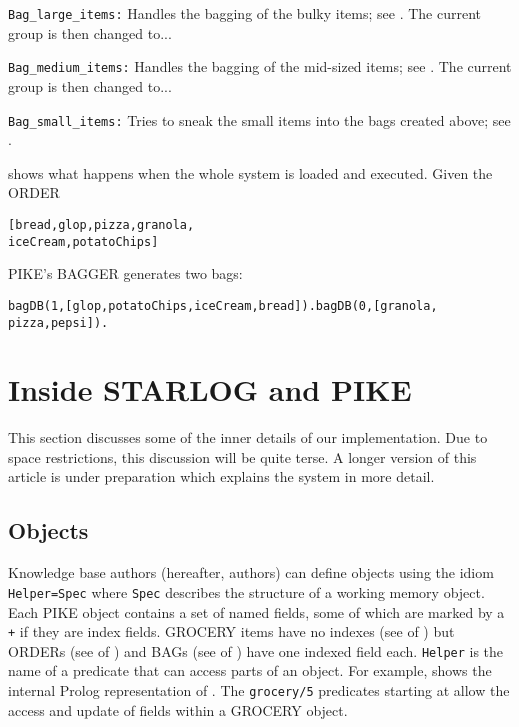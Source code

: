 \documentclass[twocolumn,global]{sys/svjour}
\begin{document}
\item[{\tt Bag\_large\_items:}]
 Handles the bagging of the bulky items; see
 .
 The current group is then changed to...



\item[{\tt Bag\_medium\_items:}]
 Handles the bagging of the mid-sized items; see
 .
 The current group is then changed to...

\item[{\tt Bag\_small\_items:}]
 Tries to sneak the small items into the bags created above; see
 .


\ed



 



 shows what happens when the whole system is loaded
and executed. Given the ORDER {\small
\begin{alltt}
[bread, glop, pizza, granola,
 iceCream, potatoChips]
\end{alltt}
} PIKE's BAGGER generates two bags:

{\small
\begin{alltt}
bagDB(1, [glop, potatoChips, iceCream, bread]). bagDB(0, [granola,
pizza, pepsi]).
\end{alltt}
}



%

%

\section{Inside STARLOG and PIKE}

This section discusses some of the inner details of our
implementation. Due to space restrictions, this discussion will be
quite terse. A longer version of this article is under preparation
which explains the system in more detail.

\subsection{Objects}

Knowledge base authors (hereafter, authors) can define objects using
the idiom \mbox{{\tt Helper=Spec}} where {\tt Spec} describes the
structure of a working memory object.
 Each PIKE object contains  a set
of named fields, some of which are marked by a {\tt +} if they are
index fields. GROCERY items have no indexes (see
 of ) but ORDERs (see
 of ) and BAGs (see
 of ) have one indexed field
each. {\tt Helper} is the name of a predicate that can access parts
of an object. For example,  shows the internal Prolog
representation of . The {\tt grocery/5} predicates
starting at  allow the access and update of
fields within a GROCERY object.
\end{document}
